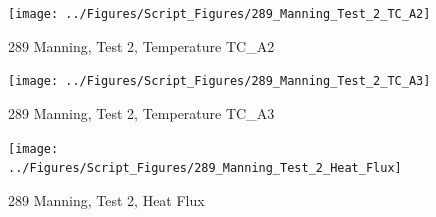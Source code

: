 \documentclass[12pt,oneside]{book}
\begin{document}
\begin{figure}[!ht]
\texttt{[image: ../Figures/Script\_Figures/289\_Manning\_Test\_2\_TC\_A2]}
\caption{289 Manning, Test 2, Temperature TC\_A2}
\label{fig:289_Manning_Test_2_TC_A2}
\end{figure}

\begin{figure}[!ht]
\texttt{[image: ../Figures/Script\_Figures/289\_Manning\_Test\_2\_TC\_A3]}
\caption{289 Manning, Test 2, Temperature TC\_A3}
\label{fig:289_Manning_Test_2_TC_A3}
\end{figure}

\begin{figure}[!ht]
\texttt{[image: ../Figures/Script\_Figures/289\_Manning\_Test\_2\_Heat\_Flux]}
\caption{289 Manning, Test 2, Heat Flux}
\label{fig:289_Manning_Test_2_Heat_Flux}
\end{figure}
\end{document}

